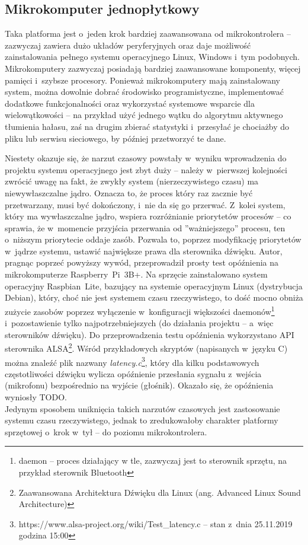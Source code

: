\subsection{Mikrokomputer jednopłytkowy}
\label{mikrokomp}
Taka platforma jest o~jeden krok bardziej zaawansowana od mikrokontrolera -- zazwyczaj zawiera dużo układów peryferyjnych oraz daje możliwość zainstalowania pełnego systemu operacyjnego Linux, Windows i~tym podobnych. Mikrokomputery zazwyczaj posiadają bardziej zaawansowane komponenty, więcej pamięci i~szybsze procesory. Ponieważ mikrokomputery mają zainstalowany system, można dowolnie dobrać środowisko programistyczne, implementować dodatkowe funkcjonalności oraz wykorzystać systemowe wsparcie dla wielowątkowości -- na przykład użyć jednego wątku do algorytmu aktywnego tłumienia hałasu, zaś na drugim zbierać statystyki i~przesyłać je chociażby do pliku lub serwisu sieciowego, by później przetworzyć te dane.

Niestety okazuje się, że narzut czasowy powstały w~wyniku wprowadzenia do projektu systemu operacyjnego jest zbyt duży -- należy w~pierwszej kolejności zwrócić uwagę na fakt, że zwykły system (nierzeczywistego czasu) ma niewywłaszczalne jądro. Oznacza to, że proces który raz zacznie być przetwarzany, musi być dokończony, i~nie da się go przerwać. Z~kolei system, który ma wywłaszczalne jądro, wspiera rozróżnianie priorytetów procesów -- co sprawia, że w~momencie przyjścia przerwania od ''ważniejszego'' procesu, ten o~niższym priorytecie oddaje zasób. Pozwala to, poprzez modyfikację priorytetów w~jądrze systemu, ustawić największe prawa dla sterownika dźwięku.
Autor, pragnąc poprzeć powyższy wywód, przeprowadził prosty test opóźnienia na mikrokomputerze Raspberry~Pi~3B+. Na sprzęcie zainstalowano system operacyjny Raspbian~Lite, bazujący na systemie operacyjnym Linux (dystrybucja Debian), który, choć nie jest systemem czasu rzeczywistego, to dość mocno obniża zużycie zasobów poprzez wyłączenie w~konfiguracji większości daemonów\footnote{daemon -- proces działający w tle, zazwyczaj jest to sterownik sprzętu, na przykład sterownik Bluetooth} i~pozostawienie tylko najpotrzebniejszych (do działania projektu -- a~więc sterowników dźwięku). Do przeprowadzenia testu opóźnienia wykorzystano API sterownika ALSA\footnote{Zaawansowana Architektura Dźwięku dla Linux (ang. Advanced Linux Sound Architecture)}. Wśród przykładowych skryptów (napisanych w~języku C) można znaleźć plik nazwany \textit{latency.c}\footnote{https://www.alsa-project.org/wiki/Test\_latency.c -- stan z~dnia 25.11.2019 godzina 15:00}, który dla kilku podstawowych częstotliwości dźwięku wylicza opóźnienie przesłania sygnału z~wejścia (mikrofonu) bezpośrednio na wyjście (głośnik). Okazało się, że opóźnienia wyniosły TODO. %
\\
Jedynym sposobem uniknięcia takich narzutów czasowych jest zastosowanie systemu czasu rzeczywistego, jednak to zredukowałoby charakter platformy sprzętowej o~krok w~tył -- do poziomu mikrokontrolera.
